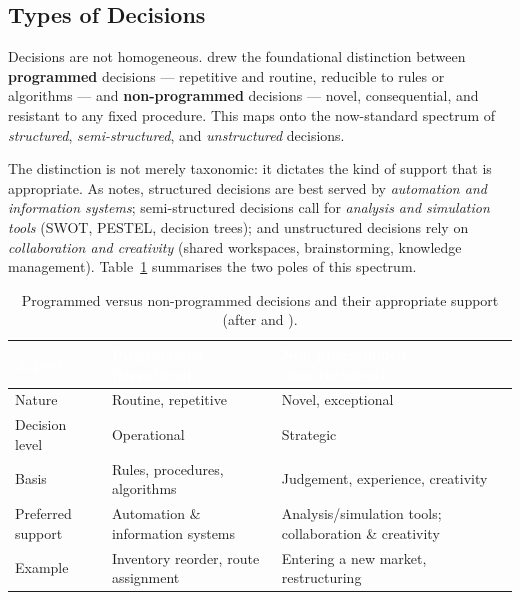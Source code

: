 \subsection{Types of Decisions}

Decisions are not homogeneous. \textcite{simon1960} drew the foundational distinction between
\textbf{programmed} decisions --- repetitive and routine, reducible to rules or algorithms --- and
\textbf{non-programmed} decisions --- novel, consequential, and resistant to any fixed procedure. This
maps onto the now-standard spectrum of \emph{structured}, \emph{semi-structured}, and
\emph{unstructured} decisions.

The distinction is not merely taxonomic: it dictates the kind of support that is appropriate. As
\textcite{chalal2024} notes, structured decisions are best served by \emph{automation and information
systems}; semi-structured decisions call for \emph{analysis and simulation tools} (SWOT, PESTEL,
decision trees); and unstructured decisions rely on \emph{collaboration and creativity} (shared
workspaces, brainstorming, knowledge management). Table~\ref{tab:ch1-decision-types} summarises the two
poles of this spectrum.

\begin{table}[H]
\centering
\caption{Programmed versus non-programmed decisions and their appropriate support
(after \textcite{simon1960} and \textcite{chalal2024}).}
\label{tab:ch1-decision-types}
\renewcommand{\arraystretch}{1.35}
\begin{tabularx}{\linewidth}{|>{\raggedright\arraybackslash}p{3.1cm}|>{\raggedright\arraybackslash}X|>{\raggedright\arraybackslash}X|}
\hline
\rowcolor{tblheader}
\textcolor{white}{\textbf{Aspect}} &
\textcolor{white}{\textbf{Programmed (structured)}} &
\textcolor{white}{\textbf{Non-programmed (unstructured)}} \\
\hline
Nature            & Routine, repetitive                 & Novel, exceptional \\
Decision level    & Operational                         & Strategic \\
Basis             & Rules, procedures, algorithms       & Judgement, experience, creativity \\
Preferred support & Automation \& information systems   & Analysis/simulation tools; collaboration \& creativity \\
Example           & Inventory reorder, route assignment & Entering a new market, restructuring \\
\hline
\end{tabularx}
\end{table}

